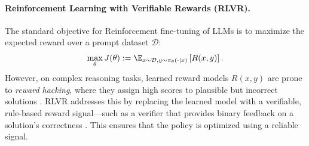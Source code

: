 \paragraph{Reinforcement Learning with Verifiable Rewards (RLVR).}
The standard objective for Reinforcement fine-tuning of LLMs is to maximize the expected reward over a prompt dataset $\mathcal{D}$:
\begin{equation}
\label{eq:rl-main-objective}
    \max_\theta J(\theta) := \E_{x \sim \mathcal{D}, y \sim \pi_\theta(\cdot\mid x)}\left[ R(x, y) \right].
\end{equation}
However, on complex reasoning tasks, learned reward models $R(x,y)$ are prone to \emph{reward hacking}, where they assign high scores to plausible but incorrect solutions \citep{gao2023scaling, perez2023discovering, weng2024rewardhack, wcq2025beyond}. RLVR addresses this by replacing the learned model with a verifiable, rule-based reward signal—such as a verifier that provides binary feedback on a solution's correctness \citep{guo2025deepseek}. This ensures that the policy is optimized using a reliable signal.

